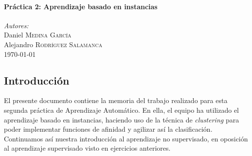 \documentclass[12pt]{article}
\begin{document}
\begin{titlepage}
\HRule \\[0.7cm]
{ \huge \bfseries Práctica 2: Aprendizaje basado en instancias}\\[0.4cm] %
\HRule \\[0.7cm]


\textit{Autores:}\\
Daniel \textsc{Medina García}\\ %
Alejandro \textsc{Rodríguez Salamanca}\\[1.1cm] %


{\large \today}\\ %


\vfill %

\end{titlepage}

\tableofcontents

\newpage
\thispagestyle{empty}
\clearpage
\vspace*{\fill}
\begin{center}
    \begin{minipage}{\textwidth}
        \begin{center}
            \section*{Introducción}
            El presente documento contiene la memoria del trabajo realizado para esta segunda práctica de Aprendizaje Automático. En ella, el equipo ha utilizado el aprendizaje basado en instancias, haciendo uso de la técnica de \textit{clustering} para poder implementar funciones de afinidad y agilizar así la clasificación. Continuamos así nuestra introducción al aprendizaje no supervisado, en oposición al aprendizaje supervisado visto en ejercicios anteriores.
        \end{center}
    \end{minipage}
\end{center}
\vfill
\end{document}
